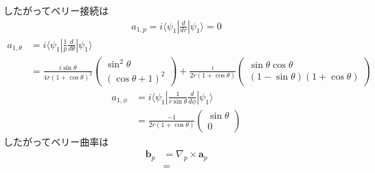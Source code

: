 \documentclass[uplatex,a4j,11pt,dvipdfmx]{jsarticle}
\begin{document}
したがってベリー接続は
\begin{align*}
  a_{1,p}=i\langle\psi_1|\frac{d}{dr}|\psi_1\rangle=0
\end{align*}
\begin{align*}
  a_{1,\theta}&=i\langle\psi_1|\frac{1}{p}\frac{d}{d\theta}|\psi_1\rangle\\
  &=\frac{i\sin\theta}{4r(1+\cos\theta)^2}\left(\begin{array}{c}
    \sin^2\theta\\
    (\cos\theta+1)^2
  \end{array}\right)+
  \frac{i}{2r(1+\cos\theta)}\left(\begin{array}{c}
    \sin\theta\cos\theta\\
    (1-\sin\theta)(1+\cos\theta)
  \end{array}\right)
\end{align*}
\begin{align*}
  a_{1,\phi}&=i\langle\psi_1|\frac{1}{r\sin\theta}\frac{d}{d\phi}|\psi_1\rangle\\
  &=\frac{-1}{2r(1+\cos\theta)}\left(\begin{array}{c}
    \sin\theta\\0
  \end{array}\right)
\end{align*}
したがってベリー曲率は
\begin{align*}
  {\bm b}_p&=\nabla_p\times{\bm a}_p\\
  &=
\end{align*}

\end{document}
